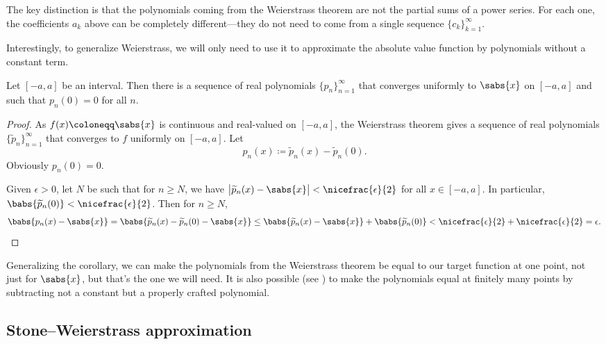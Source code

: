 The key distinction is that
the polynomials coming from the Weierstrass theorem are not the partial
sums of a power series.  For each one, the coefficients $a_k$ above can be
completely different---they do not need to come from a single sequence
$\{ c_k \}_{k=1}^\infty$.

\medskip

Interestingly, to generalize Weierstrass, we will only need to use it to
approximate the absolute value function by polynomials without
a constant term.

\begin{cor}
Let $[-a,a]$ be an interval.  Then there is a sequence of real polynomials
$\{ p_n \}_{n=1}^\infty$ that converges uniformly to $\sabs{x}$ on $[-a,a]$ and such that
$p_n(0) = 0$ for all $n$.
\end{cor}

\begin{proof}
As $f(x) \coloneqq \sabs{x}$ is continuous and real-valued
on $[-a,a]$, the Weierstrass theorem gives a sequence of
real polynomials $\{ \widetilde{p}_n \}_{n=1}^\infty$ that converges to $f$
uniformly on $[-a,a]$.
Let
\begin{equation*}
p_n(x) \coloneqq \widetilde{p}_n(x) - \widetilde{p}_n(0) .
\end{equation*}
Obviously $p_n(0) = 0$.

Given $\epsilon > 0$, let $N$ be such that
for $n \geq N$, we have
$\bigl\lvert\widetilde{p}_n(x)-\sabs{x}\big\rvert <
\nicefrac{\epsilon}{2}$ for all $x \in [-a,a]$.
In particular,
$\babs{\widetilde{p}_n(0)} < \nicefrac{\epsilon}{2}$.
Then for $n \geq N$,
\begin{equation*}
\babs{ p_n(x)-\sabs{x} }
=
\babs{ \widetilde{p}_n(x) - \widetilde{p}_n(0) - \sabs{x} }
\leq
\babs{ \widetilde{p}_n(x) - \sabs{x} } + \babs{\widetilde{p}_n(0)} < 
\nicefrac{\epsilon}{2} + \nicefrac{\epsilon}{2} = \epsilon . \qedhere
\end{equation*}
\end{proof}

Generalizing the corollary,
we can make the polynomials from the Weierstrass theorem
be equal to our target function at one point, not just for $\sabs{x}$, but
that's the one we will need.  It is also possible (see
)
to make the polynomials
equal at finitely many points by subtracting not a constant but a properly
crafted polynomial.

\subsection{Stone--Weierstrass approximation}

